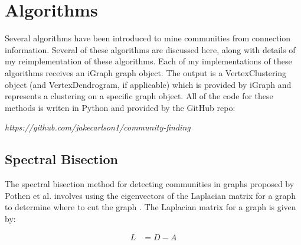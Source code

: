 \documentclass{article}
\begin{document}
\section{Algorithms}
Several algorithms have been introduced to mine communities from connection information. Several of these algorithms are discussed here, along with details of my reimplementation of these algorithms. Each of my implementations of these algorithms receives an iGraph graph object. The output is a VertexClustering object (and VertexDendrogram, if applicable) which is provided by iGraph and represents a clustering on a specific graph object. All of the code for these methods is writen in Python and provided by the GitHub repo:

\textit{https://github.com/jakecarlson1/community-finding}

    \subsection{Spectral Bisection}
    The spectral bisection method for detecting communities in graphs proposed by Pothen et al. involves using the eigenvectors of the Laplacian matrix for a graph to determine where to cut the graph \cite{doi:10.1137/0611030}. The Laplacian matrix for a graph is given by:

    \begin{align}
        L &= D - A
    \end{align}
\end{document}
